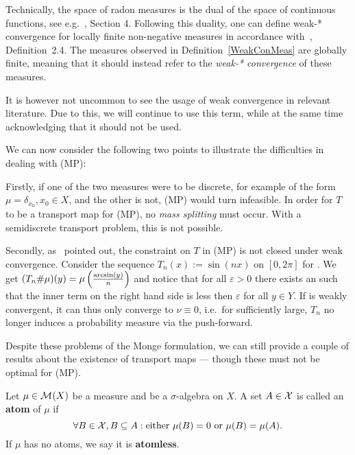 \begin{remark}
	Technically, the space of radon measures is the dual of the space of continuous functions, see e.g.\ \cite{Kapl1957}, Section 4. Following this duality, one can define weak-* convergence for locally finite non-negative measures in accordance with\ \cite{Cami2008}, Definition~2.4. The measures observed in Definition~\ref{WeakConMeas} are globally finite, meaning that it should instead refer to the \textit{weak-* convergence} of these measures.

	It is however not uncommon to see the usage of weak convergence in relevant literature. Due to this, we will continue to use this term, while at the same time acknowledging that it should not be used.
\end{remark}

We can now consider the following two points to illustrate the difficulties in dealing with (MP):

Firstly, if one of the two measures were to be discrete, for example of the form $\mu = \delta_{x_0}, x_0 \in X$, and the other is not, (MP) would turn infeasible. In order for $T$ to be a transport map for (MP), no \textit{mass splitting} must occur. With a semidiscrete transport problem, this is not possible.

Secondly, as~\cite{San2015} pointed out, the constraint on $T$ in (MP) is not closed under weak convergence. Consider the sequence $T_n(x) := \sin(nx)$ on $[0, 2 \pi]$ for \NinN. We get $(\push[T_n]{\mu})(y) = \mu\left( \frac{\arcsin(y)}{n} \right)$ and notice that for all $\varepsilon > 0$ there exists an \NinN{} such that the inner term on the right hand side is less then $\varepsilon$ for all $y \in Y$. If \push[T_n]{\mu} is weakly convergent, it can thus only converge to $\nu \equiv 0$, i.e.\ for \NinN{} sufficiently large, $T_n$ no longer induces a probability measure via the push-forward.

Despite these problems of the Monge formulation, we can still provide a couple of results about the existence of transport maps --- though these must not be optimal for (MP).

\begin{definition}\label{Atoms}
	Let $\mu \in \M{X}$ be a measure and \X{} be a $\sigma$-algebra on $X$. A set $A \in \X$ is called an \textbf{atom} of $\mu$ if
	\[ \forall B \in \X, B \subseteq A : \text{either } \mu(B) = 0 \text{ or } \mu(B) = \mu(A). \]
	If $\mu$ has no atoms, we say it is \textbf{atomless}.
\end{definition}

